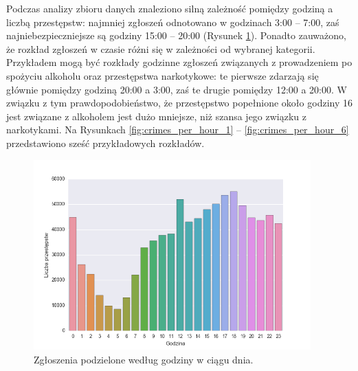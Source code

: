 \documentclass[11pt]{article} %
\begin{document}
Podczas analizy zbioru danych znaleziono silną zależność pomiędzy godziną a liczbą przestępstw: najmniej zgłoszeń odnotowano w godzinach 3:00 -- 7:00, zaś najniebezpieczniejsze są godziny 15:00 -- 20:00 (Rysunek \ref{fig:hours}). Ponadto zauważono, że rozkład zgłoszeń w czasie różni się w zależności od wybranej kategorii. Przykładem mogą być rozkłady godzinne zgłoszeń związanych z prowadzeniem po spożyciu alkoholu oraz przestępstwa narkotykowe: te pierwsze zdarzają się głównie pomiędzy godziną 20:00 a 3:00, zaś te drugie pomiędzy 12:00 a 20:00. W związku z tym prawdopodobieństwo, że przestępstwo popełnione około godziny 16 jest związane z alkoholem jest dużo mniejsze, niż szansa jego związku z narkotykami. Na Rysunkach \ref{fig:crimes_per_hour_1} -- \ref{fig:crimes_per_hour_6} przedstawiono sześć przykładowych rozkładów.  \\

\begin{figure}[!h]
  \centering
    \includegraphics[width=0.95\textwidth]{images/hours}
  \caption{Zgłoszenia podzielone według godziny w ciągu dnia.} \label{fig:hours}
\end{figure}
\end{document}
